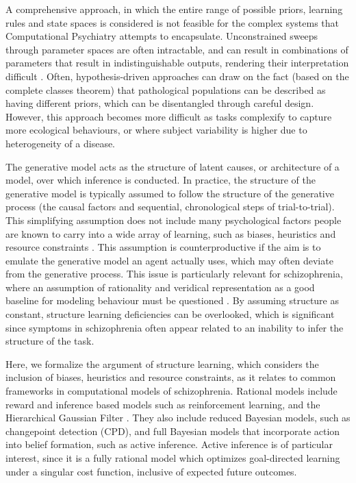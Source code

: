 \documentclass{article}
\begin{document}
A comprehensive approach, in which the entire range of possible priors, learning rules and state spaces is considered is not feasible for the complex systems that Computational Psychiatry attempts to encapsulate. Unconstrained sweeps through parameter spaces are often intractable, and can result in combinations of parameters that result in indistinguishable outputs, rendering their interpretation difficult \citep{gershman2016empirical}. Often, hypothesis-driven approaches can draw on the fact (based on the complete classes theorem) that pathological populations can be described as having different priors, which can be disentangled through careful design. However, this approach becomes more difficult as tasks complexify to capture more ecological behaviours, or where subject variability is higher due to heterogeneity of a disease.

The generative model acts as the structure of latent causes, or architecture of a model, over which inference is conducted. In practice, the structure of the generative model is typically assumed to follow the structure of the generative process (the causal factors and sequential, chronological steps of trial-to-trial). This simplifying assumption does not include many psychological factors people are known to carry into a wide array of learning, such as biases, heuristics and resource constraints \citep{lieder2020resource-rational}. This assumption is counterproductive if the aim is to emulate the generative model an agent actually uses, which may often deviate from the generative process. This issue is particularly relevant for schizophrenia, where an assumption of rationality and veridical representation as a good baseline for modeling behaviour must be questioned \citep{bari2024resource-rational}. By assuming structure as constant, structure learning deficiencies can be overlooked, which is significant since symptoms in schizophrenia often appear related to  an inability to infer the structure of the task.

Here, we formalize the argument of structure learning, which considers the inclusion of biases, heuristics and resource constraints, as it relates to common frameworks in computational models of schizophrenia. Rational models include reward and inference based models such as reinforcement learning, and the Hierarchical Gaussian Filter \citep{sutton1998reward, mathys2011bayesian}. They also include reduced Bayesian models, such as changepoint detection (CPD), and full Bayesian models that incorporate action into belief formation, such as active inference. Active inference is of particular interest, since it is a fully rational model which optimizes goal-directed learning under a singular cost function, inclusive of expected future outcomes.
\end{document}
